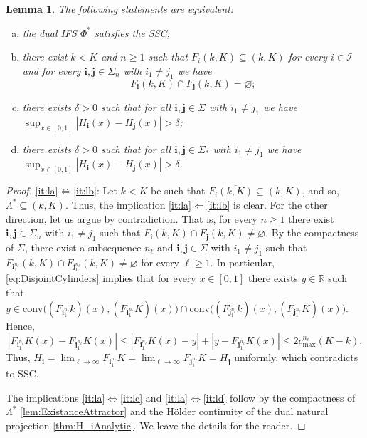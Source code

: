 \documentclass[11pt,]{article}
\def\cref#1{\ref{#1}}%
\newtheorem{lemma}[theorem]{Lemma}
\theoremstyle{definition}
\theoremstyle{remark}
\newcommand{\0}{\mathbf{0}}
\newcommand{\bi}{\mathbf{i}}
\newcommand{\bj}{\mathbf{j}}
\begin{document}
\begin{lemma}\label{lem:SSCEequiv}
The following statements are equivalent: 
\begin{enumerate}[a)]
\item\label{it:la} the dual IFS $\Phi^*$ satisfies the SSC;
\item\label{it:lb} there exist $k<K$ and $n\geq1$ such that $F_{i}(k,K)\subseteq(k,K)$ for every $i\in\mathcal{I}$ and for every $\bi,\bj\in\Sigma_n$ with $i_1\neq j_1$ we have
\begin{equation*}
	F_{\bi}(k,K)\cap F_{\bj}(k,K)=\varnothing; 
\end{equation*}
\item\label{it:lc} there exists $\delta>0$ such that for all $\bi,\bj \in\Sigma$ with $i_1\neq j_1$ we have
  $\sup_{x\in[0,1]} |H_{\bi}(x) - H_{\bj}(x)| > \delta$;
\item\label{it:ld} there exists $\delta>0$ such that for all $\bi,\bj \in\Sigma_*$ with $i_1\neq j_1$ we have
  $\sup_{x\in[0,1]} |H_{\bi}(x) - H_{\bj}(x)| > \delta$.
\end{enumerate}
\end{lemma}


\begin{proof}
	\cref{it:la}$\Leftrightarrow$\cref{it:lb}: Let $k<K$ be such that $F_{i}\overline{(k,K)}\subseteq(k,K)$, and so, $\Lambda^*\subseteq(k,K)$. Thus, the implication \cref{it:la}$\Leftarrow$\cref{it:lb} is clear. For the other direction, let us argue by contradiction. That is, for every $n\geq1$ there exist $\bi,\bj\in\Sigma_n$ with $i_1\neq j_1$ such that $F_{\bi}(k,K)\cap F_{\bj}(k,K)\neq\varnothing$. By the compactness of $\Sigma$, there exist a subsequence $n_\ell$ and $\bi,\bj\in\Sigma$ with $i_1\neq j_1$ such that $F_{\bi_1^{n_\ell}}(k,K)\cap F_{\bj_1^{n_\ell}}(k,K)\neq\varnothing$ for every $\ell\geq1$. In particular, \cref{eq:DisjointCylinders} implies that for every $x\in[0,1]$ there exists $y\in\mathbb{R}$ such that $y\in\mathrm{conv}\big((F_{\bi_1^{n_\ell}}k)(x), (F_{\bi_1^{n_\ell}}K)(x)\big) \cap \mathrm{conv}\big((F_{\bj_1^{n_\ell}}k)(x), (F_{\bj_1^{n_\ell}}K)(x)\big)$. Hence,
	$$
	|F_{\bi_1^{n_\ell}}K(x)-F_{\bj_1^{n_\ell}}K(x)|\leq |F_{\bi_1^{n_\ell}}K(x)-y|+|y-F_{\bj_1^{n_\ell}}K(x)|\leq 2c_{\max}^{n_\ell}(K-k).
	$$
	Thus, $H_{\bi}=\lim_{\ell\to\infty}F_{\bi_1^{n_\ell}}K=\lim_{\ell\to\infty}F_{\bj_1^{n_\ell}}K=H_{\bj}$ uniformly, which contradicts to SSC.
	
	The implications \cref{it:la}$\Leftrightarrow$\cref{it:lc} and \cref{it:la}$\Leftrightarrow$\cref{it:ld} follow by the compactness of $\Lambda^*$ \cref{lem:ExistanceAttractor} and the H\"older continuity of the dual natural projection \cref{thm:H_iAnalytic}. We leave the details for the reader.
\end{proof}
\end{document}
